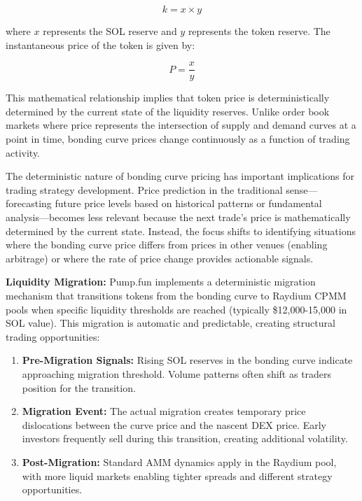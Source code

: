 \documentclass[12pt,a4paper]{article}
\begin{document}
\begin{equation}
k = x \times y
\end{equation}

where $x$ represents the SOL reserve and $y$ represents the token reserve. The instantaneous price of the token is given by:

\begin{equation}
P = \frac{x}{y}
\end{equation}

This mathematical relationship implies that token price is deterministically determined by the current state of the liquidity reserves. Unlike order book markets where price represents the intersection of supply and demand curves at a point in time, bonding curve prices change continuously as a function of trading activity.

The deterministic nature of bonding curve pricing has important implications for trading strategy development. Price prediction in the traditional sense—forecasting future price levels based on historical patterns or fundamental analysis—becomes less relevant because the next trade's price is mathematically determined by the current state. Instead, the focus shifts to identifying situations where the bonding curve price differs from prices in other venues (enabling arbitrage) or where the rate of price change provides actionable signals.

\textbf{Liquidity Migration:} Pump.fun implements a deterministic migration mechanism that transitions tokens from the bonding curve to Raydium CPMM pools when specific liquidity thresholds are reached (typically \$12,000-15,000 in SOL value). This migration is automatic and predictable, creating structural trading opportunities:

\begin{enumerate}
\item \textbf{Pre-Migration Signals:} Rising SOL reserves in the bonding curve indicate approaching migration threshold. Volume patterns often shift as traders position for the transition.
\item \textbf{Migration Event:} The actual migration creates temporary price dislocations between the curve price and the nascent DEX price. Early investors frequently sell during this transition, creating additional volatility.
\item \textbf{Post-Migration:} Standard AMM dynamics apply in the Raydium pool, with more liquid markets enabling tighter spreads and different strategy opportunities.
\end{enumerate}
\end{document}

